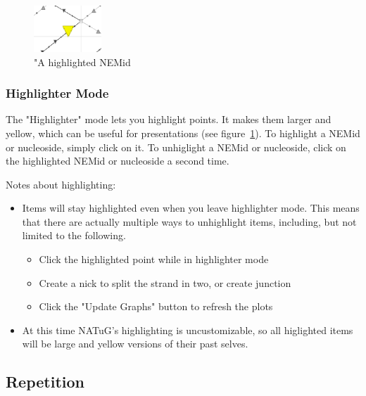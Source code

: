 \documentclass[titlepage]{article}
\begin{document}
\begin{figure} \label{fig:highlighted-NEMid}
	\centering
	\includegraphics[width=1in]{highlighted-nemid.png}
	\caption{"A highlighted NEMid}
\end{figure}

\subsubsection{Highlighter Mode}

The "Highlighter" mode lets you highlight points. It makes them larger and yellow, which can be useful for presentations (see figure~\ref{fig:highlighted-NEMid}). 
To highlight a NEMid or nucleoside, simply click on it. To unhiglight a NEMid or nucleoside, click on the highlighted NEMid or nucleoside a second time.

Notes about highlighting:
\begin{itemize}
	\item Items will stay highlighted even when you leave highlighter mode. This means that there are actually multiple ways to unhighlight items, including, but not limited to the following.
	\begin{itemize}
		\item Click the highlighted point while in highlighter mode
		\item Create a nick to split the strand in two, or create junction
		\item Click the "Update Graphs" button to refresh the plots
	\end{itemize}

	\item At this time NATuG's highlighting is uncustomizable, so all higlighted items will be large and yellow versions of their past selves.
\end{itemize}

\subsection{Repetition}
\end{document}
